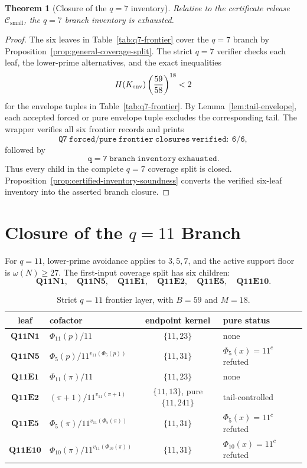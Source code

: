 \documentclass[11pt]{article}
\newtheorem{theorem}{Theorem}[section]
\theoremstyle{definition}
\theoremstyle{remark}
\newcommand{\Hfun}{H}
\newcommand{\Csmall}{\ensuremath{\mathcal C_{\mathrm{small}}}}
\begin{document}
\begin{theorem}[Closure of the \(q=7\) inventory]
\label{thm:q7-closed}
Relative to the certificate release \(\Csmall\), the \(q=7\) branch inventory is
exhausted.
\end{theorem}

\begin{proof}
The six leaves in Table~\ref{tab:q7-frontier} cover the \(q=7\) branch by
Proposition~\ref{prop:general-coverage-split}.  The strict \(q=7\) verifier
checks each leaf, the lower-prime alternatives, and the exact inequalities
\[
  \Hfun(K_{\rm env})\left(\frac{59}{58}\right)^{18}<2
\]
for the envelope tuples in Table~\ref{tab:q7-frontier}.  By
Lemma~\ref{lem:tail-envelope}, each accepted forced or pure envelope tuple excludes
the corresponding tail.  The wrapper verifies all six frontier records and
prints
\[
  \mathtt{Q7\ forced/pure\ frontier\ closures\ verified:\ 6/6},
\]
followed by
\[
  \mathtt{q=7\ branch\ inventory\ exhausted}.
\]
Thus every child in the complete \(q=7\) coverage split is closed.
Proposition~\ref{prop:certified-inventory-soundness} converts the verified
six-leaf inventory into the asserted branch closure.
\end{proof}

\section{Closure of the \(q=11\) Branch}
\label{sec:q11}

For \(q=11\), lower-prime avoidance applies to \(3,5,7\), and the active
support floor is \(\omega(N)\ge27\).  The first-input coverage split has six
children:
\[
  \mathbf{Q11N1},\quad \mathbf{Q11N5},\quad
  \mathbf{Q11E1},\quad \mathbf{Q11E2},\quad
  \mathbf{Q11E5},\quad \mathbf{Q11E10}.
\]

\begin{table}[ht]
\centering
\small
\begin{tabularx}{\textwidth}{c|>{\raggedright\arraybackslash}X|c|>{\raggedright\arraybackslash}p{}}
\toprule
leaf & cofactor & endpoint kernel & pure status\\
\midrule
\(\mathbf{Q11N1}\) & \(\Phi_{11}(p)/11\) & \(\{11,23\}\) & none\\
\(\mathbf{Q11N5}\) & \(\Phi_5(p)/11^{v_{11}(\Phi_5(p))}\) & \(\{11,31\}\) & \(\Phi_5(x)=11^c\) refuted\\
\(\mathbf{Q11E1}\) & \(\Phi_{11}(\pi)/11\) & \(\{11,23\}\) & none\\
\(\mathbf{Q11E2}\) & \((\pi+1)/11^{v_{11}(\pi+1)}\) & \(\{11,13\}\), pure \(\{11,241\}\) & tail-controlled\\
\(\mathbf{Q11E5}\) & \(\Phi_5(\pi)/11^{v_{11}(\Phi_5(\pi))}\) & \(\{11,31\}\) & \(\Phi_5(x)=11^c\) refuted\\
\(\mathbf{Q11E10}\) & \(\Phi_{10}(\pi)/11^{v_{11}(\Phi_{10}(\pi))}\) & \(\{11,31\}\) & \(\Phi_{10}(x)=11^c\) refuted\\
\bottomrule
\end{tabularx}
\caption{Strict \(q=11\) frontier layer, with \(B=59\) and \(M=18\).}
\label{tab:q11-frontier}
\end{table}
\FloatBarrier
\end{document}
